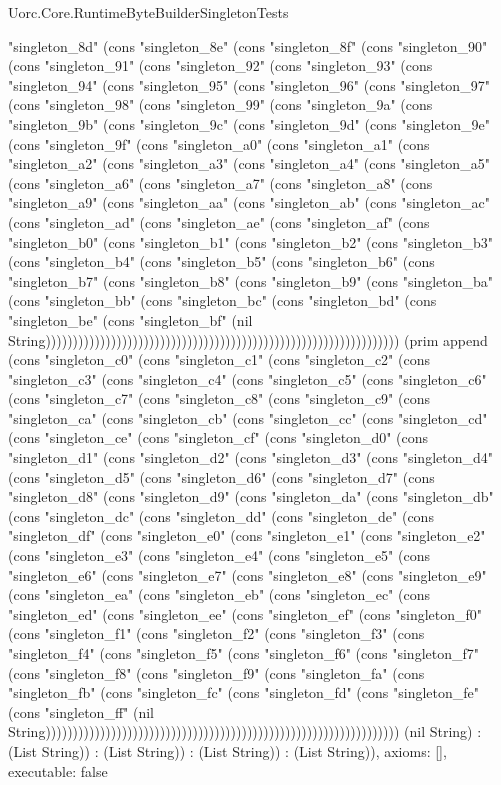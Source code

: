 \begin{lexlean}{Uorc.Core.RuntimeByteBuilderSingletonTests}
\begin{semanticmodule}
{"singleton_8d" (cons "singleton_8e" (cons "singleton_8f" (cons "singleton_90" (cons "singleton_91" (cons "singleton_92" (cons "singleton_93" (cons "singleton_94" (cons "singleton_95" (cons "singleton_96" (cons "singleton_97" (cons "singleton_98" (cons "singleton_99" (cons "singleton_9a" (cons "singleton_9b" (cons "singleton_9c" (cons "singleton_9d" (cons "singleton_9e" (cons "singleton_9f" (cons "singleton_a0" (cons "singleton_a1" (cons "singleton_a2" (cons "singleton_a3" (cons "singleton_a4" (cons "singleton_a5" (cons "singleton_a6" (cons "singleton_a7" (cons "singleton_a8" (cons "singleton_a9" (cons "singleton_aa" (cons "singleton_ab" (cons "singleton_ac" (cons "singleton_ad" (cons "singleton_ae" (cons "singleton_af" (cons "singleton_b0" (cons "singleton_b1" (cons "singleton_b2" (cons "singleton_b3" (cons "singleton_b4" (cons "singleton_b5" (cons "singleton_b6" (cons "singleton_b7" (cons "singleton_b8" (cons "singleton_b9" (cons "singleton_ba" (cons "singleton_bb" (cons "singleton_bc" (cons "singleton_bd" (cons "singleton_be" (cons "singleton_bf" (nil String))))))))))))))))))))))))))))))))))))))))))))))))))))))))))))))))) (prim append (cons "singleton_c0" (cons "singleton_c1" (cons "singleton_c2" (cons "singleton_c3" (cons "singleton_c4" (cons "singleton_c5" (cons "singleton_c6" (cons "singleton_c7" (cons "singleton_c8" (cons "singleton_c9" (cons "singleton_ca" (cons "singleton_cb" (cons "singleton_cc" (cons "singleton_cd" (cons "singleton_ce" (cons "singleton_cf" (cons "singleton_d0" (cons "singleton_d1" (cons "singleton_d2" (cons "singleton_d3" (cons "singleton_d4" (cons "singleton_d5" (cons "singleton_d6" (cons "singleton_d7" (cons "singleton_d8" (cons "singleton_d9" (cons "singleton_da" (cons "singleton_db" (cons "singleton_dc" (cons "singleton_dd" (cons "singleton_de" (cons "singleton_df" (cons "singleton_e0" (cons "singleton_e1" (cons "singleton_e2" (cons "singleton_e3" (cons "singleton_e4" (cons "singleton_e5" (cons "singleton_e6" (cons "singleton_e7" (cons "singleton_e8" (cons "singleton_e9" (cons "singleton_ea" (cons "singleton_eb" (cons "singleton_ec" (cons "singleton_ed" (cons "singleton_ee" (cons "singleton_ef" (cons "singleton_f0" (cons "singleton_f1" (cons "singleton_f2" (cons "singleton_f3" (cons "singleton_f4" (cons "singleton_f5" (cons "singleton_f6" (cons "singleton_f7" (cons "singleton_f8" (cons "singleton_f9" (cons "singleton_fa" (cons "singleton_fb" (cons "singleton_fc" (cons "singleton_fd" (cons "singleton_fe" (cons "singleton_ff" (nil String))))))))))))))))))))))))))))))))))))))))))))))))))))))))))))))))) (nil String) : (List String)) : (List String)) : (List String)) : (List String)),
  axioms: [],
  executable: false
}
\end{semanticmodule}
\end{lexlean}

